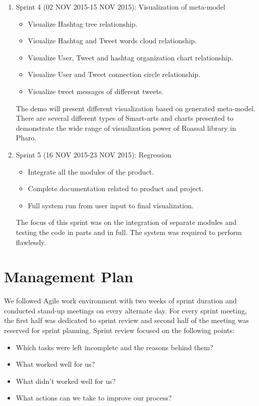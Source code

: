 \documentclass[11pt]{article}
\begin{document}
\begin{enumerate}
\item Sprint 4 (02 NOV 2015-15 NOV 2015): Visualization of meta-model
\begin{itemize}
\item Visualize Hashtag tree relationship. 

\item Visualize Hashtag and Tweet words cloud relationship. 

\item Visualize User, Tweet and hashtag organization chart relationship. 

\item Visualize User and Tweet connection circle relationship. 

\item Visualize tweet messages of different tweets. 
\end{itemize}
The demo will present different visualization based on generated meta-model. There are several different types of Smart-arts and charts presented to demonstrate the wide range of visualization power of Roassal library in Pharo. 

\item Sprint 5 (16 NOV 2015-23 NOV 2015): Regression
\begin{itemize}
\item Integrate all the modules of the product.
\item Complete documentation related to product and project.
\item Full system run from user input to final visualization.
\end{itemize}
The focus of this sprint was on the integration of separate modules and testing the code in parts and in full. The system was required to perform flawlessly.
\end{enumerate}


\section{Management Plan}
We followed Agile work environment with two weeks of sprint duration and conducted stand-up meetings on every alternate day. For every sprint meeting, the first half was dedicated to sprint review and second half of the meeting was reserved for sprint planning. Sprint review focused on the following points: 
\begin{itemize}
\item Which tasks were left incomplete and the reasons behind them? 
\item What worked well for us?
\item What didn't worked well for us?
\item What actions can we take to improve our process?
\end{itemize}
\end{document}
